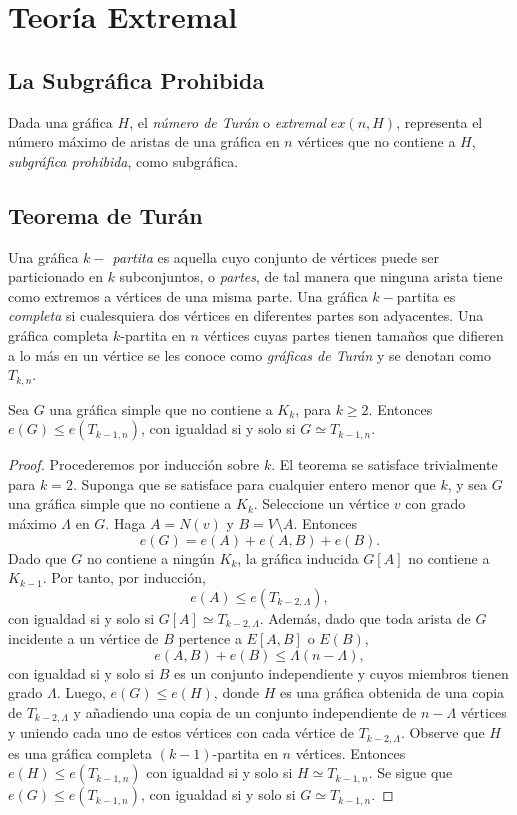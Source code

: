 \chapter{Teoría Extremal}

\section{La Subgráfica Prohibida}
Dada una gráfica $H$, el \textit{número de Turán} o \textit{extremal}
$ex(n, H)$, representa el número máximo de aristas de una gráfica en
$n$ vértices que no contiene a $H$, \textit{subgráfica prohibida},
como subgráfica.

\section{Teorema de Turán}
Una gráfica \textit{$k-$ partita} es aquella cuyo conjunto de
vértices puede ser particionado en $k$ subconjuntos, o
\textit{partes}, de tal manera que ninguna arista tiene como extremos
a vértices de una misma parte. Una gráfica $k-$partita es
\textit{completa} si cualesquiera dos vértices en diferentes partes
son adyacentes. Una gráfica completa $k$-partita en $n$ vértices
cuyas partes tienen tamaños que difieren a lo más en un vértice se
les conoce como  \textit{gráficas de Turán} y se denotan como $T_{k, n}$.
\begin{theorem} \label{turan}
  Sea $G$ una gráfica simple que no contiene a $K_k$, para $k \geq
  2$. Entonces $e(G) \leq e(T_{{k-1}, n})$, con igualdad si y solo si
  $G \simeq T_{{k-1}, n}$.
\end{theorem}

\begin{proof}
  Procederemos por inducción sobre $k$. El teorema se satisface
  trivialmente para $k=2$.  Suponga que se satisface para cualquier
  entero menor que $k$, y sea $G$ una gráfica simple que no contiene
  a $K_k$. Seleccione un vértice $v$ con grado máximo $\Lambda$ en
  $G$. Haga $A = N(v)$ y $B = V \setminus A$. Entonces
  $$e(G) = e(A) + e(A, B) + e(B).$$
  Dado que $G$ no contiene a ningún $K_k$, la gráfica inducida $G[A]$
  no contiene a $K_{k-1}$. Por tanto, por inducción,
  $$e(A) \leq e(T_{k-2, \Lambda}),$$
  con igualdad si y solo si $G[A] \simeq T_{{k-2}, \Lambda}$. Además,
  dado que toda arista de $G$ incidente a un vértice de $B$ pertence
  a $E[A, B]$ o $E( B )$,
  $$e(A, B) + e(B) \leq \Lambda (n - \Lambda),$$
  con igualdad si y solo si $B$ es un conjunto independiente y cuyos
  miembros tienen grado $\Lambda$. Luego, $e(G) \leq e(H)$, donde $H$
  es una gráfica obtenida de una copia de $T_{{k-2}, \Lambda}$ y
  añadiendo una copia de un conjunto independiente de $n-\Lambda$
  vértices y uniendo cada uno de estos vértices con cada vértice de
  $T_{{k-2}, \Lambda}$. Observe que $H$ es una gráfica completa
  $(k-1)$-partita en $n$ vértices. Entonces $e(H) \leq e(T_{{k-1},
  n})$ con igualdad si y solo si $H \simeq T_{{k-1}, n}$. Se sigue
  que $e(G) \leq e(T_{k-1, n})$, con igualdad si y solo si $G \simeq
  T_{k-1, n}$.
\end{proof}

